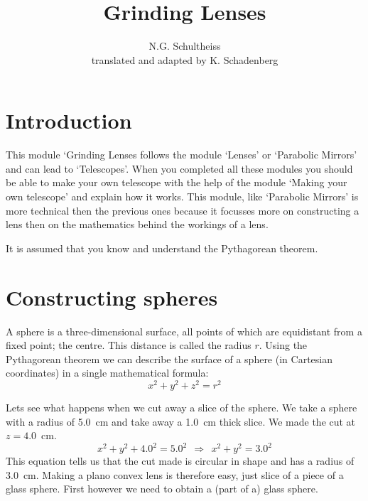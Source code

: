 


\author{N.G. Schultheiss \\ translated and adapted by K. Schadenberg}
\date{}
\title{Grinding Lenses}



\maketitle

\section{Introduction}

This module `Grinding Lenses follows the module `Lenses' or `Parabolic Mirrors' and can lead to `Telescopes'. When you completed all these modules you should be able to make your own telescope with the help of the module `Making your own telescope' and explain how it works. This module, like `Parabolic Mirrors' is more technical then the previous ones because it focusses more on constructing a lens then on the mathematics behind the workings of a lens.

It is assumed that you know and understand the Pythagorean theorem.


\section{Constructing spheres}

A sphere is a three-dimensional surface, all points of which are equidistant from a fixed point; the centre. This distance is called the radius $r$. Using the Pythagorean theorem we can describe the surface of a sphere (in Cartesian coordinates) in a single mathematical formula:
\begin{equation}
x^2 + y^2 + z^2 = r^2 \label{eq:sphere}
\end{equation}

Lets see what happens when we cut away a slice of the sphere. We take a sphere with a radius of 5.0~cm and take away a 1.0~cm thick slice. We made the cut at $z=4.0$~cm.
\begin{equation*}
x^2 + y^2 + 4.0^2 = 5.0^2 ~~\Rightarrow~~ x^2 + y^2 = 3.0^2
\end{equation*}
This equation tells us that the cut made is circular in shape and has a radius of 3.0~cm. Making a plano convex lens is therefore easy, just slice of a piece of a glass sphere. First however we need to obtain a (part of a) glass sphere.

